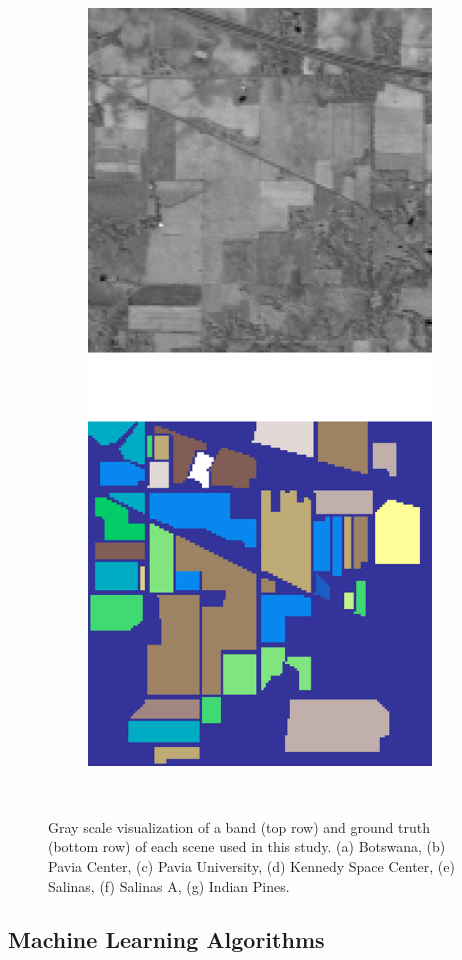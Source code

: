 \begin{figure}
\begin{subfigure}{.24\textwidth}
		\includegraphics[height=1.5\linewidth]{indian_pines}
		\subcaption{{\medbreak}}\label{fig:indian_pines}
	\end{subfigure}
    \caption[Gray scale visualization of a band and ground truth
    of each scene used in this study.]{Gray scale visualization of a band (top
        row) and ground truth (bottom row) of each scene used in this study.
        (a) Botswana, (b) Pavia Center, (c) Pavia University, (d) Kennedy
        Space Center, (e) Salinas, (f) Salinas A, (g) Indian Pines.
    }~\label{fig:scenes_lulc}
	
\end{figure}

\subsection{Machine Learning Algorithms}


